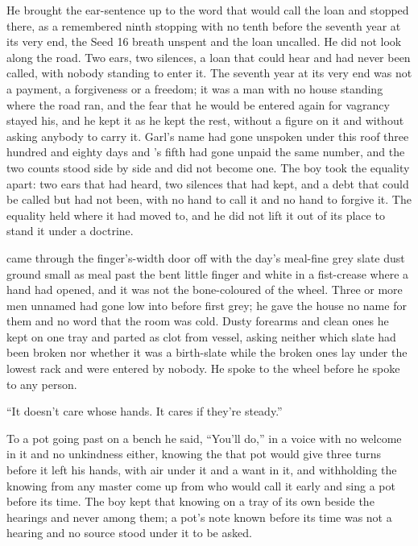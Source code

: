 He brought the ear-sentence up to the word that would call the loan and stopped there, as a remembered ninth stopping with no tenth before the seventh year at its very end, the Seed 16 breath unspent and the loan uncalled. He did not look along the road. Two ears, two silences, a loan that could hear and had never been called, with nobody standing to enter it. The seventh year at its very end was not a payment, a forgiveness or a freedom; it was a man with no house standing where the road ran, and the fear that he would be entered again for vagrancy stayed his, and he kept it as he kept the rest, without a figure on it and without asking anybody to carry it. Garl's name had gone unspoken under this roof three hundred and eighty days and 's fifth had gone unpaid the same number, and the two counts stood side by side and did not become one. The boy took the equality apart: two ears that had heard, two silences that had kept, and a debt that could be called but had not been, with no hand to call it and no hand to forgive it. The equality held where it had moved to, and he did not lift it out of its place to stand it under a doctrine.

\scenebreak

 came through the finger's-width door off  with the day's meal-fine grey slate dust ground small as meal past the bent little finger and white in a fist-crease where a hand had opened, and it was not the bone-coloured  of the wheel. Three or more men unnamed had gone low into  before first grey; he gave the house no name for them and no word that the room was cold. Dusty forearms and clean ones he kept on one tray and parted as clot from vessel, asking neither which slate had been broken nor whether it was a birth-slate while the broken ones lay under the lowest rack and were entered by nobody. He spoke to the wheel before he spoke to any person.

“It doesn't care whose hands. It cares if they're steady.”

To a pot going past on a bench he said, “You'll do,” in a voice with no welcome in it and no unkindness either, knowing the  that pot would give three turns before it left his hands, with air under it and a want in it, and withholding the knowing from any master come up from  who would call it early and sing a pot before its time. The boy kept that knowing on a tray of its own beside the hearings and never among them; a pot's note known before its time was not a hearing and no source stood under it to be asked.

